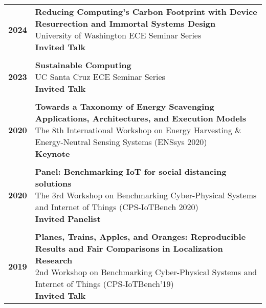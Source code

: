 \documentclass{article}
\begin{document}
\renewcommand{\arraystretch}{0.5}
\begin{longtable}{>{\bf}p{1cm} l}
  2024 & \makecell{
    \textbf{Reducing Computing's Carbon Footprint with Device Resurrection and Immortal Systems Design} \\
    University of Washington ECE Seminar Series \\
    \textbf{\color{BrickRed} Invited Talk} \\
  } \\

  \\

  2023 & \makecell{
    \textbf{Sustainable Computing} \\
    UC Santa Cruz ECE Seminar Series \\
    \textbf{\color{BrickRed} Invited Talk} \\
  } \\

  \\

  2020 & \makecell{
    \textbf{Towards a Taxonomy of Energy Scavenging Applications, Architectures, and Execution Models} \\
    The 8th International Workshop on Energy Harvesting \& Energy-Neutral Sensing Systems (ENSsys 2020) \\
    \textbf{\color{BrickRed} Keynote} \\
  } \\

  \\

  2020 & \makecell{
    \textbf{Panel: Benchmarking IoT for social distancing solutions} \\
    The 3rd Workshop on Benchmarking Cyber-Physical Systems and Internet of Things (CPS-IoTBench 2020) \\
    \textbf{\color{BrickRed} Invited Panelist} \\
  } \\

  \\

  2019 & \makecell{
    \textbf{Planes, Trains, Apples, and Oranges: Reproducible Results and Fair Comparisons in Localization Research} \\
    2nd Workshop on Benchmarking Cyber-Physical Systems and Internet of Things (CPS-IoTBench'19) \\
    \textbf{\color{BrickRed} Invited Talk} \\
  } \\


\end{longtable}
\end{document}
